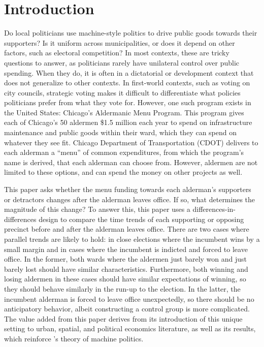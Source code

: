 \section{Introduction}\label{sec:Introduction}

Do local politicians use machine-style politics to drive public goods towards their supporters? Is it uniform across municipalities, or does it depend on other factors, such as electoral competition?
In most contexts, these are tricky questions to answer, as politicians rarely have unilateral control over public spending. 
When they do, it is often in a dictatorial or development context that does not generalize to other contexts.
In first-world contexts, such as voting on city councils, strategic voting makes it difficult to differentiate
what policies politicians prefer from what they vote for. 
However, one such program exists in the United States: Chicago's Aldermanic Menu Program.
This program gives each of Chicago's 50 aldermen \$1.5 million each year to spend on infrastructure maintenance and public goods within their ward, which they can spend on whatever they see fit.
Chicago Department of Transportation (CDOT) delivers to each alderman a ``menu'' of common expenditures, from which the program's name is derived, that each alderman can choose from.
However, aldermen are not limited to these options, and can spend the money on other projects as well.

This paper asks whether the menu funding towards each alderman's supporters or detractors changes after the alderman leaves office.
If so, what determines the magnitude of this change? 
To answer this, this paper uses a differences-in-differences design to compare the time trends of each supporting or opposing precinct before and after the alderman leaves office.
There are two cases where parallel trends are likely to hold: in close elections where the incumbent wins by a small margin and in cases where the incumbent is indicted and forced to leave office.
In the former, both wards where the aldermen just barely won and just barely lost should have similar characteristics.
Furthermore, both winning and losing aldermen in these cases should have similar expectations of winning, so they should behave similarly in the run-up to the election.
In the latter, the incumbent alderman is forced to leave office unexpectedly, so there should be no anticipatory behavior, albeit constructing a control group is more complicated.
The value added from this paper derives from its introduction of this unique setting to urban, spatial, and political economics literature, as well as its results, which reinforce \cite{dixit_londregan1996}'s theory of machine politics.


